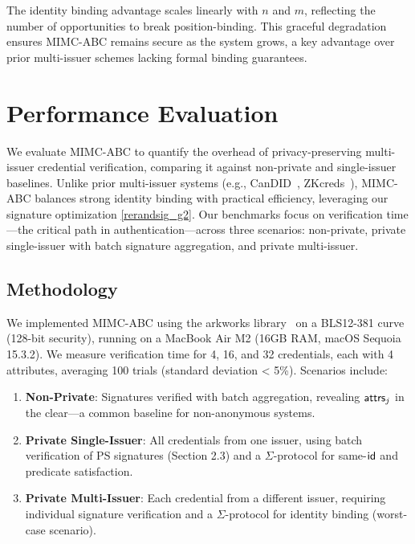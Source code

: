 The identity binding advantage scales linearly with $n$ and $m$, reflecting the number of opportunities to break position-binding. This graceful degradation ensures MIMC-ABC remains secure as the system grows, a key advantage over prior multi-issuer schemes lacking formal binding guarantees.



\section{Performance Evaluation}

We evaluate MIMC-ABC to quantify the overhead of privacy-preserving multi-issuer credential verification, comparing it against non-private and single-issuer baselines. Unlike prior multi-issuer systems (e.g., CanDID~\cite{maram2021candid}, ZKcreds~\cite{rosenberg_zk-creds_2022}), MIMC-ABC balances strong identity binding with practical efficiency, leveraging our signature optimization \ref{rerandsig_g2}. Our benchmarks focus on verification time—the critical path in authentication—across three scenarios: non-private, private single-issuer with batch signature aggregation, and private multi-issuer.

\subsection{Methodology}

We implemented MIMC-ABC using the arkworks library~\cite{arkworks_contributors_arkworks_2022} on a BLS12-381 curve (128-bit security), running on a MacBook Air M2 (16GB RAM, macOS Sequoia 15.3.2). We measure verification time for 4, 16, and 32 credentials, each with 4 attributes, averaging 100 trials (standard deviation < 5\%). Scenarios include:
\begin{enumerate}
    \item \textbf{Non-Private}: Signatures verified with batch aggregation, revealing $\mathsf{attrs}_j$ in the clear—a common baseline for non-anonymous systems.
    \item \textbf{Private Single-Issuer}: All credentials from one issuer, using batch verification of PS signatures (Section 2.3) and a $\Sigma$-protocol for same-$\mathsf{id}$ and predicate satisfaction.
    \item \textbf{Private Multi-Issuer}: Each credential from a different issuer, requiring individual signature verification and a $\Sigma$-protocol for identity binding (worst-case scenario).
\end{enumerate}





